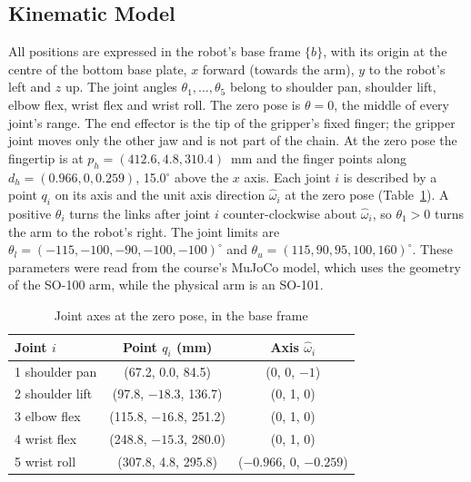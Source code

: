 \documentclass[letterpaper, 10 pt, conference]{ieeeconf}
\begin{document}
\subsection{Kinematic Model}
\label{sec:model}
All positions are expressed in the robot's base frame $\{b\}$, with its origin at the centre of the bottom
base plate, $x$ forward (towards the arm), $y$ to the robot's left and $z$ up. The joint angles
$\theta_1,\dots,\theta_5$ belong to shoulder pan, shoulder lift, elbow flex, wrist flex and wrist roll.
The zero pose is $\theta = 0$, the middle of every joint's range. The end effector is the tip of the
gripper's fixed finger; the gripper joint moves only the other jaw and is not part of the chain. At the zero
pose the fingertip is at $p_h = (412.6, 4.8, 310.4)$~mm and the finger points along
$d_h = (0.966, 0, 0.259)$, 15.0$^\circ$ above the $x$ axis. Each joint $i$ is described by a point $q_i$ on
its axis and the unit axis direction $\hat{\omega}_i$ at the zero pose (Table~\ref{tab:joints}). A positive
$\theta_i$ turns the links after joint $i$ counter-clockwise about $\hat{\omega}_i$, so $\theta_1 > 0$
turns the arm to the robot's right. The joint limits are
$\theta_l = (-115, -100, -90, -100, -100)^\circ$ and $\theta_u = (115, 90, 95, 100, 160)^\circ$.
These parameters were read from the course's MuJoCo model, which uses the geometry of the SO-100 arm,
while the physical arm is an SO-101.

\begin{table}[t]
\caption{Joint axes at the zero pose, in the base frame}
\label{tab:joints}
\begin{center}
\begin{tabular}{lcc}
\toprule
Joint $i$ & Point $q_i$ (mm) & Axis $\hat{\omega}_i$ \\
\midrule
1 shoulder pan   & (67.2, 0.0, 84.5)   & (0, 0, $-1$) \\
2 shoulder lift  & (97.8, $-18.3$, 136.7) & (0, 1, 0) \\
3 elbow flex     & (115.8, $-16.8$, 251.2) & (0, 1, 0) \\
4 wrist flex     & (248.8, $-15.3$, 280.0) & (0, 1, 0) \\
5 wrist roll     & (307.8, 4.8, 295.8)  & ($-0.966$, 0, $-0.259$) \\
\bottomrule
\end{tabular}
\end{center}
\end{table}
\end{document}
